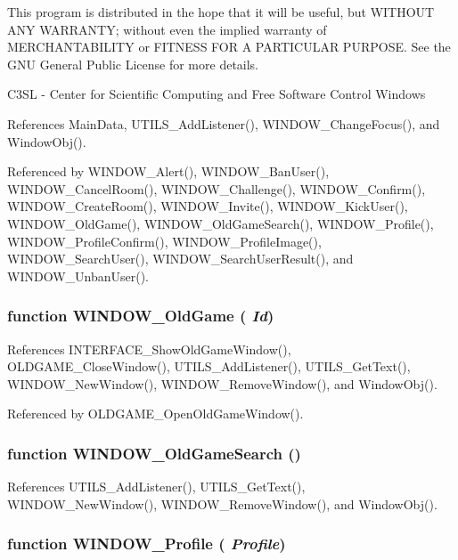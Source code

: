 This program is distributed in the hope that it will be useful, but WITHOUT ANY WARRANTY; without even the implied warranty of MERCHANTABILITY or FITNESS FOR A PARTICULAR PURPOSE. See the GNU General Public License for more details.

C3SL - Center for Scientific Computing and Free Software Control Windows 

References MainData, UTILS\_\-AddListener(), WINDOW\_\-ChangeFocus(), and WindowObj().

Referenced by WINDOW\_\-Alert(), WINDOW\_\-BanUser(), WINDOW\_\-CancelRoom(), WINDOW\_\-Challenge(), WINDOW\_\-Confirm(), WINDOW\_\-CreateRoom(), WINDOW\_\-Invite(), WINDOW\_\-KickUser(), WINDOW\_\-OldGame(), WINDOW\_\-OldGameSearch(), WINDOW\_\-Profile(), WINDOW\_\-ProfileConfirm(), WINDOW\_\-ProfileImage(), WINDOW\_\-SearchUser(), WINDOW\_\-SearchUserResult(), and WINDOW\_\-UnbanUser().
\subsubsection{\setlength{\rightskip}{0pt plus 5cm}function WINDOW\_\-OldGame ( {\em Id})}\label{window_2window_8js_76f9685e2f3edd1a2ac62bd9f921da86}




References INTERFACE\_\-ShowOldGameWindow(), OLDGAME\_\-CloseWindow(), UTILS\_\-AddListener(), UTILS\_\-GetText(), WINDOW\_\-NewWindow(), WINDOW\_\-RemoveWindow(), and WindowObj().

Referenced by OLDGAME\_\-OpenOldGameWindow().
\subsubsection{\setlength{\rightskip}{0pt plus 5cm}function WINDOW\_\-OldGameSearch ()}\label{window_2window_8js_cb65f4ab22f79c8778aa45561d67eab0}




References UTILS\_\-AddListener(), UTILS\_\-GetText(), WINDOW\_\-NewWindow(), WINDOW\_\-RemoveWindow(), and WindowObj().
\subsubsection{\setlength{\rightskip}{0pt plus 5cm}function WINDOW\_\-Profile ( {\em Profile})}\label{window_2window_8js_200e97ff4969f4c9092c6ac314e06c1e}




